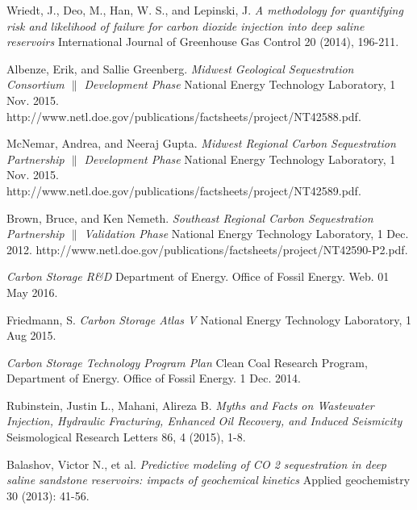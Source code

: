 \documentclass[a4paper, 12pt]{article}
\begin{document}
 
\begin{thebibliography}{9}

Wriedt, J., Deo, M., Han, W. S., and Lepinski, J.
\textit{A methodology for quantifying risk and likelihood of failure for carbon dioxide injection into deep saline reservoirs}
International Journal of Greenhouse Gas Control 20 (2014), 196-211.

Albenze, Erik, and Sallie Greenberg. 
\textit{Midwest Geological Sequestration Consortium $\|$ Development Phase}
National Energy Technology Laboratory, 1 Nov. 2015. http://www.netl.doe.gov/publications/factsheets/project/NT42588.pdf.

McNemar, Andrea, and Neeraj Gupta. 
\textit{Midwest Regional Carbon Sequestration Partnership $\|$ Development Phase}
National Energy Technology Laboratory, 1 Nov. 2015. http://www.netl.doe.gov/publications/factsheets/project/NT42589.pdf.

Brown, Bruce, and Ken Nemeth. 
\textit{Southeast Regional Carbon Sequestration Partnership $\|$ Validation Phase}
National Energy Technology Laboratory, 1 Dec. 2012. http://www.netl.doe.gov/publications/factsheets/project/NT42590-P2.pdf.

\textit{Carbon Storage R\&D} Department of Energy. Office of Fossil Energy. Web. 01 May 2016.

Friedmann, S. 
\textit{Carbon Storage Atlas V} 
National Energy Technology Laboratory, 1 Aug 2015.

\textit{Carbon Storage Technology Program Plan}
Clean Coal Research Program, Department of Energy. Office of Fossil Energy. 1 Dec. 2014.

Rubinstein, Justin L., Mahani, Alireza B.
\textit{Myths and Facts on Wastewater Injection, Hydraulic Fracturing, Enhanced Oil Recovery, and Induced Seismicity}
Seismological Research Letters 86, 4 (2015), 1-8. 

Balashov, Victor N., et al.
\textit{Predictive modeling of CO 2 sequestration in deep saline sandstone reservoirs: impacts of geochemical kinetics}
Applied geochemistry 30 (2013): 41-56.

\end{thebibliography}
\end{document}
